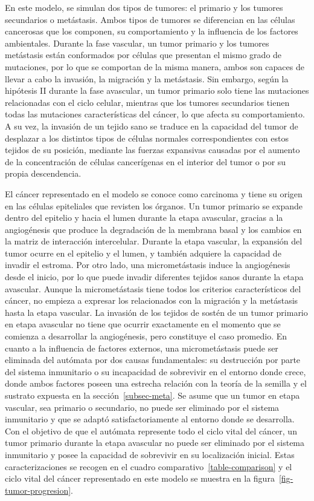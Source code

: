 En este modelo, se simulan dos tipos de tumores: el primario y los tumores secundarios o metástasis. Ambos tipos de tumores se diferencian en las células cancerosas que los componen, su comportamiento y la influencia de los factores ambientales. Durante la fase vascular, un tumor primario y los tumores metástasis están conformados por células que presentan el mismo grado de mutaciones, por lo que se comportan de la misma manera, ambos son capaces de llevar a cabo la invasi\'on, la migraci\'on y la met\'astasis. Sin embargo, según la hipótesis II durante la fase avascular, un tumor primario solo tiene las mutaciones relacionadas con el ciclo celular, mientras que los tumores secundarios tienen todas las mutaciones características del cáncer, lo que afecta su comportamiento. A su vez, la invasi\'on de un tejido sano se traduce en la capacidad del tumor de desplazar a los distintos tipos de c\'elulas normales correspondientes con estos tejidos de su posici\'on, mediante las fuerzas expansivas causadas por el aumento de la concentraci\'on de c\'elulas cancer\'igenas en el interior del tumor o por su propia descendencia. 

El cáncer representado en el modelo se conoce como carcinoma y tiene su origen en las células epiteliales que revisten los órganos. Un tumor primario se expande dentro del epitelio y hacia el lumen durante la etapa avascular, gracias a la angiogénesis que produce la degradación de la membrana basal y los cambios en la matriz de interacción intercelular. Durante la etapa vascular, la expansión del tumor ocurre en el epitelio y el lumen, y también adquiere la capacidad de invadir el estroma. Por otro lado, una micrometástasis induce la angiogénesis desde el inicio, por lo que puede invadir diferentes tejidos sanos durante la etapa avascular. Aunque la micrometástasis tiene todos los criterios característicos del cáncer, no empieza a expresar los relacionados con la migración y la metástasis hasta la etapa vascular. La invasi\'on de los tejidos de sost\'en de un tumor primario en etapa avascular no tiene que ocurrir exactamente en el momento que se comienza a desarrollar la angiog\'enesis, pero constituye el caso promedio. En cuanto a la influencia de factores externos, una micromet\'astasis puede ser eliminada del aut\'omata por dos causas fundamentales: su destrucci\'on por parte del sistema inmunitario o su incapacidad de sobrevivir en el entorno donde crece, donde ambos factores poseen una estrecha relaci\'on con la teor\'ia de la semilla y el sustrato expuesta en la secci\'on~\ref{subsec-meta}. Se asume que un tumor en etapa vascular, sea primario o secundario, no puede ser eliminado por el sistema inmunitario y que se adapt\'o satisfactoriamente al entorno donde se desarrolla. Con el objetivo de que el aut\'omata represente todo el ciclo vital del c\'ancer, un tumor primario durante la etapa avascular no puede ser eliminado por el sistema inmunitario y posee la capacidad de sobrevivir en su localizaci\'on inicial. Estas caracterizaciones se recogen en el cuadro comparativo~\ref{table-comparison} y el ciclo vital del c\'ancer representado en este modelo se muestra en la figura~\ref{fig-tumor-progresion}. 

